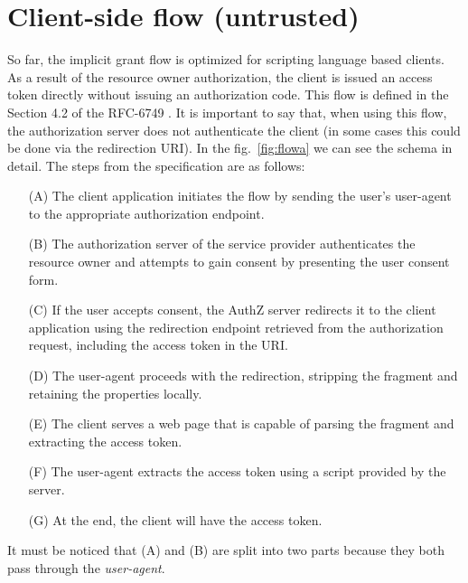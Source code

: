 \section{Client-side flow (untrusted)}
So far, the implicit grant flow is optimized for scripting language based clients. As a result of the resource owner authorization, the client is issued an access token directly without issuing an authorization code. This flow is defined in the Section 4.2 of the RFC-6749 \cite{RFC6749}. It is important to say that, when using this flow, the authorization server does not authenticate the client (in some cases this could be done via the redirection URI). In the fig.~\ref{fig:flowa} we can see the schema in detail. The steps from the specification are as follows:

\begin{itemize}
    \item[(A)]The client application initiates the flow by sending the user's user-agent to the appropriate authorization endpoint.
    \item[(B)]The authorization server of the service provider authenticates the resource owner and attempts to gain consent by presenting the user consent form.
    \item[(C)]If the user accepts consent, the AuthZ server redirects it to the client application using the redirection endpoint retrieved from the authorization request, including the access token in the URI.
    \item[(D)]The user-agent proceeds with the redirection, stripping the fragment and retaining the properties locally.
    \item[(E)]The client serves a web page that is capable of parsing the fragment and extracting the access token.
    \item[(F)]The user-agent extracts the access token using a script provided by the server.
    \item[(G)] At the end, the client will have the access token.
\end{itemize}

It must be noticed that (A) and (B) are split into two parts because they both pass through the \textit{user-agent}.

